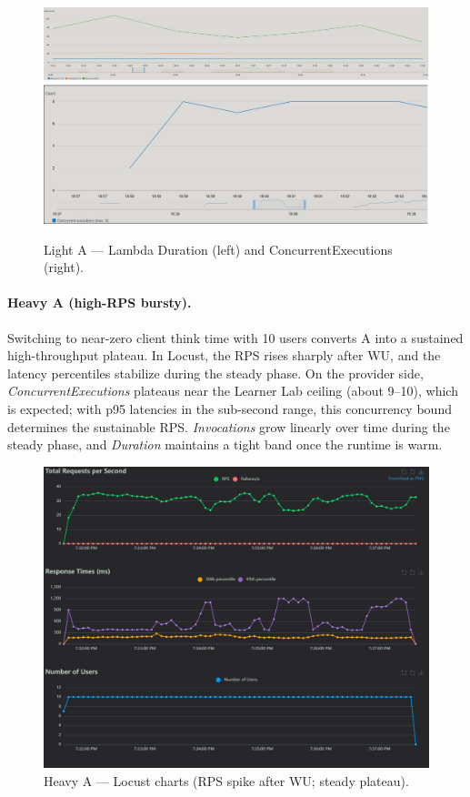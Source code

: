 \documentclass[11pt,a4paper]{article}
\begin{document}
\begin{figure}[h!] \centering
  \includegraphics[width=.48\linewidth]{"figures/lA - Duration.png"}\hfill
  \includegraphics[width=.48\linewidth]{"figures/lA - ConcExecutions.png"}
  \caption{Light A --- Lambda Duration (left) and ConcurrentExecutions (right).}
\end{figure}

\paragraph{Heavy A (high-RPS bursty).}
Switching to near-zero client think time with 10 users converts A into a sustained high-throughput plateau. In Locust, the RPS rises sharply after WU, and the latency percentiles stabilize during the steady phase. On the provider side, \emph{ConcurrentExecutions} plateaus near the Learner Lab ceiling (about 9--10), which is expected; with p95 latencies in the sub-second range, this concurrency bound determines the sustainable RPS. \emph{Invocations} grow linearly over time during the steady phase, and \emph{Duration} maintains a tight band once the runtime is warm.

\begin{figure}[h!] \centering
  \includegraphics[width=\linewidth]{"figures/hA - Charts.png"}
  \caption{Heavy A --- Locust charts (RPS spike after WU; steady plateau).}
\end{figure}
\end{document}

